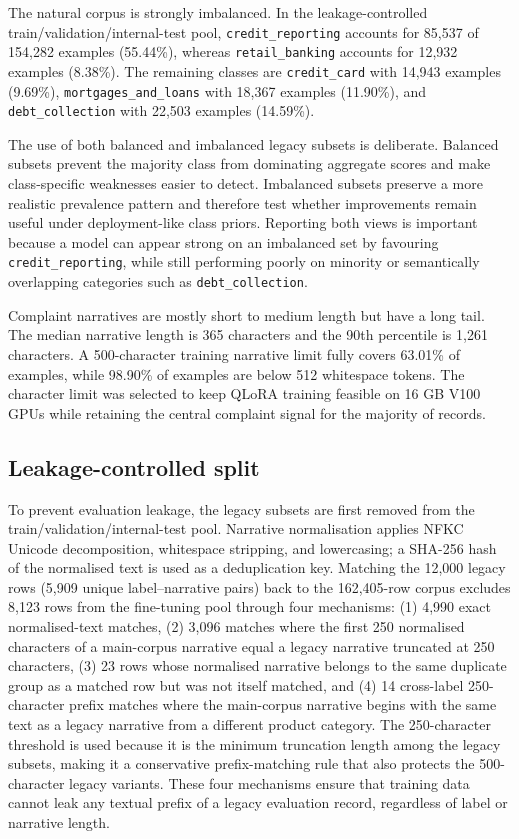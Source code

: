 \documentclass{elektr}
\begin{document}
The natural corpus is strongly imbalanced. In the leakage-controlled train/validation/internal-test pool, \texttt{credit\_reporting} accounts for 85,537 of 154,282 examples (55.44\%), whereas \texttt{retail\_banking} accounts for 12,932 examples (8.38\%). The remaining classes are \texttt{credit\_card} with 14,943 examples (9.69\%), \texttt{mortgages\_and\_loans} with 18,367 examples (11.90\%), and \texttt{debt\_collection} with 22,503 examples (14.59\%).

The use of both balanced and imbalanced legacy subsets is deliberate. Balanced subsets prevent the majority class from dominating aggregate scores and make class-specific weaknesses easier to detect. Imbalanced subsets preserve a more realistic prevalence pattern and therefore test whether improvements remain useful under deployment-like class priors. Reporting both views is important because a model can appear strong on an imbalanced set by favouring \texttt{credit\_reporting}, while still performing poorly on minority or semantically overlapping categories such as \texttt{debt\_collection}.

Complaint narratives are mostly short to medium length but have a long tail. The median narrative length is 365 characters and the 90th percentile is 1,261 characters. A 500-character training narrative limit fully covers 63.01\% of examples, while 98.90\% of examples are below 512 whitespace tokens. The character limit was selected to keep QLoRA training feasible on 16 GB V100 GPUs while retaining the central complaint signal for the majority of records.

\subsection{Leakage-controlled split}

To prevent evaluation leakage, the legacy subsets are first removed from the train/validation/internal-test pool. Narrative normalisation applies NFKC Unicode decomposition, whitespace stripping, and lowercasing; a SHA-256 hash of the normalised text is used as a deduplication key. Matching the 12,000 legacy rows (5,909 unique label--narrative pairs) back to the 162,405-row corpus excludes 8,123 rows from the fine-tuning pool through four mechanisms: (1) 4,990 exact normalised-text matches, (2) 3,096 matches where the first 250 normalised characters of a main-corpus narrative equal a legacy narrative truncated at 250 characters, (3) 23 rows whose normalised narrative belongs to the same duplicate group as a matched row but was not itself matched, and (4) 14 cross-label 250-character prefix matches where the main-corpus narrative begins with the same text as a legacy narrative from a different product category. The 250-character threshold is used because it is the minimum truncation length among the legacy subsets, making it a conservative prefix-matching rule that also protects the 500-character legacy variants. These four mechanisms ensure that training data cannot leak any textual prefix of a legacy evaluation record, regardless of label or narrative length.
\end{document}

